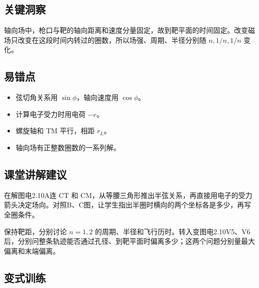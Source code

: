 \documentclass[UTF8,fontset=fandol,a4paper,11pt]{ctexart}
\begin{document}


\subsection*{关键洞察}

轴向场中，枪口与靶的轴向距离和速度分量固定，故到靶平面的时间固定。改变磁场只改变在这段时间内转过的圈数，所以场强、周期、半径分别随 $n,1/n,1/n$ 变化。



\subsection*{易错点}

\begin{itemize}
\item 弦切角关系用 $\sin\phi$，轴向速度用 $\cos\phi$。
\item 计算电子受力时用电荷 $-e$。
\item 螺旋轴和 TM 平行，相距 $r_L$。
\item 轴向场有正整数圈数的一系列解。
\end{itemize}



\subsection*{课堂讲解建议}

在解图电2.10A连 CT 和 CM，从等腰三角形推出半弦关系，再直接用电子的受力箭头决定场向。对照B、C图，让学生指出半圈时横向的两个坐标各是多少，再写全圈条件。

保持靶距，分别讨论 $n=1,2$ 的周期、半径和飞行历时。转入变图电2.10V5、V6后，分别问整条轨迹能否通过孔径、到靶平面时偏离多少；这两个问题分别量最大偏离和末端偏离。


\subsection*{变式训练}
\end{document}
